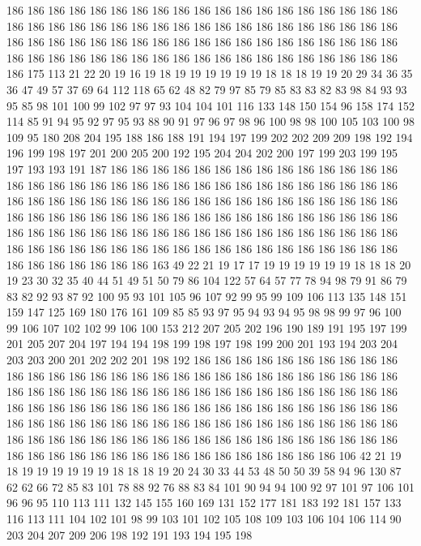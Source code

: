 186 186 186 186 186 186 186 186 186 186 186 186 186 186 186 186 186 186 186 186
186 186 186 186 186 186 186 186 186 186 186 186 186 186 186 186 186 186 186 186
186 186 186 186 186 186 186 186 186 186 186 186 186 186 186 186 186 186 186 186
186 186 186 186 186 186 186 186 186 186 186 186 186 186 186 186 186 175 113 21
22 20 19 16 19 18 19 19 19 19 19 19 18 18 18 19 19 20 29 34
36 35 36 47 49 57 37 69 64 112 118 65 62 48 82 79 97 85 79 85
83 83 82 83 98 84 93 93 95 85 98 101 100 99 102 97 97 93 104 104
101 116 133 148 150 154 96 158 174 152 114 85 91 94 95 92 97 95 93 88
90 91 97 96 97 98 96 100 98 98 100 105 103 100 98 109 95 180 208 204
195 188 186 188 191 194 197 199 202 202 209 209 198 192 194 196 199 198 197 201
200 205 200 192 195 204 204 202 200 197 199 203 199 195 197 193 193 191 187 186
186 186 186 186 186 186 186 186 186 186 186 186 186 186 186 186 186 186 186 186
186 186 186 186 186 186 186 186 186 186 186 186 186 186 186 186 186 186 186 186
186 186 186 186 186 186 186 186 186 186 186 186 186 186 186 186 186 186 186 186
186 186 186 186 186 186 186 186 186 186 186 186 186 186 186 186 186 186 186 186
186 186 186 186 186 186 186 186 186 186 186 186 186 186 186 186 186 186 186 186
186 186 186 186 186 186 186 186 186 186 186 186 186 186 186 163 49 22 21 19
17 17 19 19 19 19 19 19 18 18 18 20 19 23 30 32 35 40 44 51
49 51 50 79 86 104 122 57 64 57 77 78 94 98 79 91 86 79 83 82
92 93 87 92 100 95 93 101 105 96 107 92 99 95 99 109 106 113 135 148
151 159 147 125 169 180 176 161 109 85 85 93 97 95 94 93 94 95 98 98
99 97 96 100 99 106 107 102 102 99 106 100 153 212 207 205 202 196 190 189
191 195 197 199 201 205 207 204 197 194 194 198 199 198 197 198 199 200 201 193
194 203 204 203 203 200 201 202 202 201 198 192 186 186 186 186 186 186 186 186
186 186 186 186 186 186 186 186 186 186 186 186 186 186 186 186 186 186 186 186
186 186 186 186 186 186 186 186 186 186 186 186 186 186 186 186 186 186 186 186
186 186 186 186 186 186 186 186 186 186 186 186 186 186 186 186 186 186 186 186
186 186 186 186 186 186 186 186 186 186 186 186 186 186 186 186 186 186 186 186
186 186 186 186 186 186 186 186 186 186 186 186 186 186 186 186 186 186 186 186
186 186 186 186 186 186 186 186 186 186 186 186 186 106 42 21 19 18 19 19
19 19 19 19 18 18 18 19 20 24 30 33 44 53 48 50 50 39 58 94
96 130 87 62 62 66 72 85 83 101 78 88 92 76 88 83 84 101 90 94
94 100 92 97 101 97 106 101 96 96 95 110 113 111 132 145 155 160 169 131
152 177 181 183 192 181 157 133 116 113 111 104 102 101 98 99 103 101 102 105
108 109 103 106 104 106 114 90 203 204 207 209 206 198 192 191 193 194 195 198
